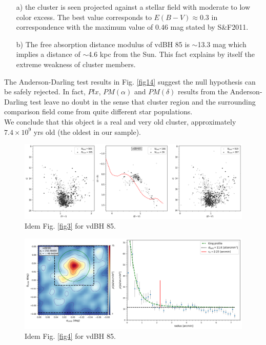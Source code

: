 \documentclass[draft]{aa}
\begin{document}
\begin{itemize}
\item [a)] the cluster is seen projected against a stellar field with moderate
    to low color excess. The best value corresponds to $E(B-V)\approx0.3$ in
    correspondence with the maximum value of 0.46 mag stated by S\&F2011.
\item [b)] The free absorption distance modulus of vdBH 85 is
    $\sim$13.3 mag which implies a distance of $\sim$4.6 kpc from the Sun. This
    fact explains by itself the extreme weakness of cluster members.
\end{itemize}

The Anderson-Darling test results in Fig. \ref{fig14} suggest the null
hypothesis can be safely rejected. In fact, $Plx$, $PM(\alpha)$ and
$PM(\delta)$ results from the Anderson-Darling test leave no doubt in the sense
that cluster region and the surrounding comparison field come from quite
different star populations.\\

We conclude that this object is a real and very old cluster, approximately
$7.4\times10^9$ yrs old (the oldest in our sample).

\begin{figure}[ht]
    \centering
    \includegraphics[width=\hsize]{../figs/obs_vdBH85.png}
    \caption{Idem Fig. \ref{fig3} for vdBH 85.}
    \label{fig11}
\end{figure}

\begin{figure}[ht]
    \centering
    \includegraphics[width=\hsize]{../figs/dmap_vdbh85.png}
    \caption{Idem Fig. \ref{fig4} for vdBH 85.}
    \label{fig12}
\end{figure}
\end{document}
